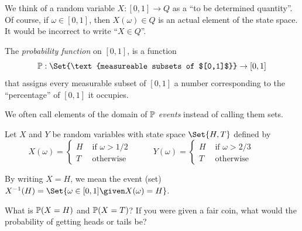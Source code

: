	We think of a random variable $X:[0,1]\to Q$ as a ``to be determined quantity''. Of course, if $\omega\in [0,1]$, then
	$X(\omega)\in Q$ is an actual element of the state space. It would be incorrect to write ``$X\in Q$''.

	\begin{definition}
		The \emph{probability function} on $[0,1]$, is a function
		\[
			\P:\Set{\text{measureable subsets of $[0,1]$}}\to[0,1]
		\]
		that assigns every measurable subset of $[0,1]$ a number corresponding to
		the ``percentage'' of $[0,1]$ it occupies.
	\end{definition}

	We often call elements of the domain of $\P$ \emph{events} instead of calling them sets.

	\question
		Let $X$ and $Y$ be random variables with state space $\Set{H,T}$ defined by 
		\[
			X(\omega)=\begin{cases}
				H&\text{ if $\omega > 1/2$ }\\
				T&\text{ otherwise}
			\end{cases}\qquad
			Y(\omega)=\begin{cases}
				H&\text{ if $\omega > 2/3$ }\\
				T&\text{ otherwise}
			\end{cases}\qquad
		\]
	\begin{parts}
		\item By writing $X = H$, we mean the event (set) $X^{-1}(H)=\Set{\omega\in[0,1]\given X(\omega)=H}$.

			What is $\P(X=H)$ and $\P(X=T)$? If you were given a fair coin, what would the probability
			of getting heads or tails be?
	\end{parts}


%

